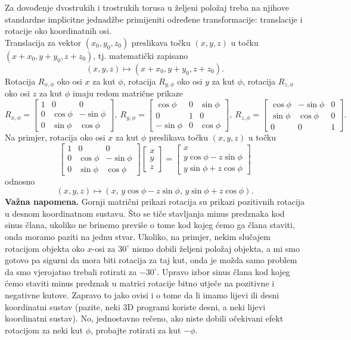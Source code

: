 \documentclass[a4paper,12pt]{article}
\theoremstyle{zad}
\begin{document}
\noindent Za dovođenje dvostrukih i trostrukih torusa u željeni položaj treba na njihove standardne implicitne jednadžbe
primijeniti određene transformacije: translacije i rotacije oko koordinatnih osi.\\[3pt]
Translacija za vektor $(x_0,y_0,z_0)$ preslikava to\v{c}ku $(x,y,z)$ u to\v{c}ku
$(x+x_0,y+y_0,z+z_0)$, tj. matemati\v{c}ki zapisano
$$(x,y,z)\mapsto(x+x_0,y+y_0,z+z_0).$$
Rotacija $R_{x,\phi}$ oko osi $x$ za kut $\phi$, rotacija $R_{y,\phi}$ oko osi $y$ za kut $\phi$, rotacija $R_{z,\phi}$ oko osi $z$ za kut $\phi$ imaju redom
matri\v{c}ne prikaze
$$
R_{x,\phi}=\begin{bmatrix}1&0&0\\ 0&\cos{\phi}&-\sin{\phi}\\ 0&\sin{\phi}&\cos{\phi}\end{bmatrix},\
R_{y,\phi}=\begin{bmatrix}\cos{\phi}&0&\sin{\phi}\\ 0&1&0\\ -\sin{\phi}&0&\cos{\phi}\end{bmatrix},\
R_{z,\phi}=\begin{bmatrix}\cos{\phi}&-\sin{\phi}&0\\ \sin{\phi}&\cos{\phi}&0\\ 0&0&1\end{bmatrix}.
$$
Na primjer, rotacija oko osi $x$ za kut $\phi$ preslikava to\v{c}ku $(x,y,z)$ u to\v{c}ku
$$
\begin{bmatrix}1&0&0\\ 0&\cos{\phi}&-\sin{\phi}\\ 0&\sin{\phi}&\cos{\phi}\end{bmatrix}\begin{bmatrix}x\\ y\\ z\end{bmatrix}=
\begin{bmatrix}x\\ y\cos{\phi}-z\sin{\phi}\\ y\sin{\phi}+z\cos{\phi}\end{bmatrix}
$$
odnosno
$$(x,y,z)\mapsto (x,\,y\cos{\phi}-z\sin{\phi},\,y\sin{\phi}+z\cos{\phi}).$$
\textbf{Va\v{z}na napomena.} Gornji matri\v{c}ni prikazi rotacija su prikazi pozitivnih rotacija u desnom koordinatnom sustavu.
\v{S}to se ti\v{c}e stavljanja minus predznaka kod sinus \v{c}lana, ukoliko ne brinemo previ\v{s}e o tome kod kojeg \'cemo ga \v{c}lana staviti, onda moramo paziti na jednu stvar. Ukoliko, na primjer, nekim slu\v{c}ajem rotacijom objekta oko $x$-osi za $30^{\circ}$ nismo dobili \v{z}eljeni polo\v{z}aj objekta, a mi smo gotovo pa sigurni da mora biti rotacija za taj kut, onda je mo\v{z}da samo problem da smo vjerojatno trebali rotirati za $-30^{\circ}$. Upravo izbor sinus \v{c}lana kod kojeg \'cemo staviti minus predznak u matrici rotacije bitno utje\v{c}e na pozitivne i negativne kutove. Zapravo to jako ovisi i o tome da li imamo lijevi ili desni koordinatni sustav (pazite, neki 3D programi koriste desni, a neki lijevi koordinatni sustav). No, jednostavno re\v{c}eno, ako niste dobili o\v{c}ekivani efekt rotacijom za neki kut $\phi$, probajte rotirati za kut $-\phi$.  
 
\end{document}
